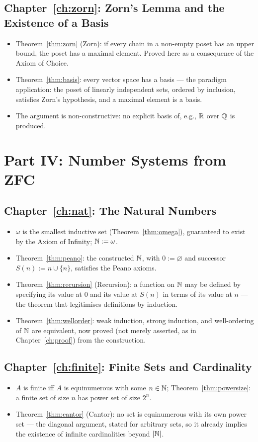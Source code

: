 \subsection*{Chapter~\ref{ch:zorn}: Zorn's Lemma and the Existence of a Basis}
\begin{itemize}
	\item Theorem~\ref{thm:zorn} (Zorn): if every chain in a non-empty poset has an upper bound, the poset has a maximal element. Proved here as a consequence of the Axiom of Choice.
	\item Theorem~\ref{thm:basis}: every vector space has a basis --- the paradigm application: the poset of linearly independent sets, ordered by inclusion, satisfies Zorn's hypothesis, and a maximal element is a basis.
	\item The argument is non-constructive: no explicit basis of, e.g., $\mathbb{R}$ over $\mathbb{Q}$ is produced.
\end{itemize}

\section*{Part IV: Number Systems from ZFC}

\subsection*{Chapter~\ref{ch:nat}: The Natural Numbers}
\begin{itemize}
	\item $\omega$ is the smallest inductive set (Theorem~\ref{thm:omega}), guaranteed to exist by the Axiom of Infinity; $\mathbb{N}:=\omega$.
	\item Theorem~\ref{thm:peano}: the constructed $\mathbb{N}$, with $0:=\varnothing$ and successor $S(n):=n\cup\{n\}$, satisfies the Peano axioms.
	\item Theorem~\ref{thm:recursion} (Recursion): a function on $\mathbb{N}$ may be defined by specifying its value at $0$ and its value at $S(n)$ in terms of its value at $n$ --- the theorem that legitimises definitions by induction.
	\item Theorem~\ref{thm:wellorder}: weak induction, strong induction, and well-ordering of $\mathbb{N}$ are equivalent, now proved (not merely asserted, as in Chapter~\ref{ch:proof}) from the construction.
\end{itemize}

\subsection*{Chapter~\ref{ch:finite}: Finite Sets and Cardinality}
\begin{itemize}
	\item $A$ is finite iff $A$ is equinumerous with some $n\in\mathbb{N}$; Theorem~\ref{thm:powersize}: a finite set of size $n$ has power set of size $2^n$.
	\item Theorem~\ref{thm:cantor} (Cantor): no set is equinumerous with its own power set --- the diagonal argument, stated for arbitrary sets, so it already implies the existence of infinite cardinalities beyond $|\mathbb{N}|$.
\end{itemize}

